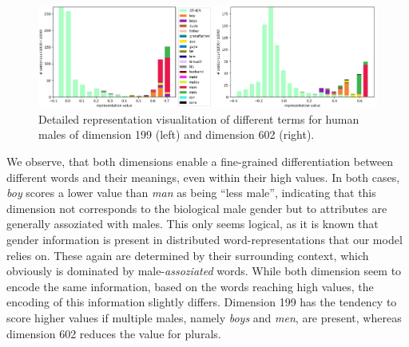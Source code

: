 \begin{figure}[tph!]
\centering
	\includegraphics[totalheight=4.5cm]{fig/mf_detailed.png}
	\caption{Detailed representation visualitation of different terms for human males of dimension 199 (left) and dimension 602 (right).}
	\label{fig:mf_detailed_m}
\end{figure}
We observe, that both dimensions enable a fine-grained differentiation between different words and their meanings, even within their high values. In both cases, \textit{boy} scores a lower value than \textit{man} as being ``less male'', indicating that this dimension not corresponds to the biological male gender but to attributes are generally assoziated with males. This only seems logical, as it is known that gender information is present in distributed word-representations \citep{mikolov2013linguistic} that our model relies on. These again are determined by their surrounding context, which obviously is dominated by male-\textit{assoziated} words. While both dimension seem to encode the same information, based on the words reaching high values, the encoding of this information slightly differs. Dimension 199 has the tendency to score higher values if multiple males, namely \textit{boys} and \textit{men}, are present, whereas dimension 602 reduces the value for plurals. 
\newline

